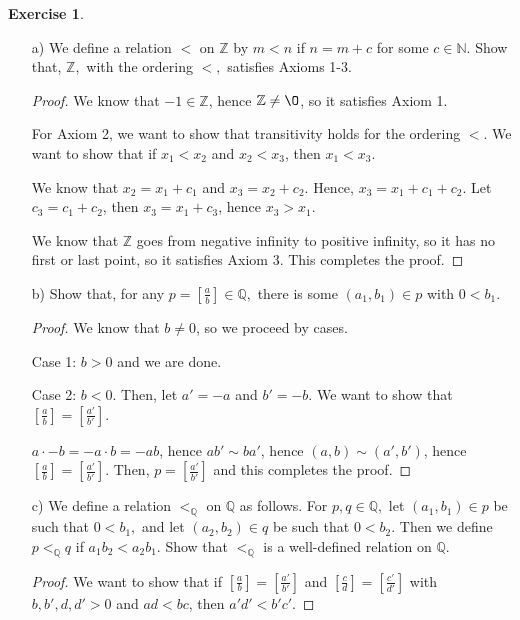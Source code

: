 \documentclass[11pt]{article}
\newcommand{\bbN}{\mathbb{N}}
\newcommand{\bbQ}{\mathbb{Q}}
\newcommand{\bbZ}{\mathbb{Z}}
\renewcommand{\emptyset}{\O}
\renewcommand{\_}[1]{\underline{ #1 }}
\theoremstyle{definition}
\newtheorem{exercise}[theorem]{Exercise}
\numberwithin{equation}{subsection}
\begin{document}
\begin{exercise}
\begin{enumerate}
\item[a)]  We define a relation $<$ on $\bbZ$ by $m<n$ if $n=m+c$ for some $c\in \bbN.$  Show that,
$\bbZ,$ with the ordering $<,$ satisfies Axioms 1-3.

\begin{proof}
We know that $-1 \in \bbZ$, hence $\bbZ \not= \emptyset$, so it satisfies Axiom 1.

For Axiom 2, we want to show that transitivity holds for the ordering $<$. We want to show that if $x_1<x_2$ and $x_2<x_3$, then $x_1<x_3$.

We know that $x_2 = x_1 + c_1$ and $x_3 = x_2 + c_2$. Hence, $x_3 = x_1 + c_1 + c_2$. Let $c_3 = c_1 + c_2$, then $x_3 = x_1 + c_3$, hence $x_3 > x_1$.

We know that $\bbZ$ goes from negative infinity to positive infinity, so it has no first or last point, so it satisfies Axiom 3. This completes the proof.

\renewcommand\qedsymbol{QED}
\end{proof}

\item[b)] Show that, for any $p=\left[\frac{a}{b}\right]\in\bbQ,$ there is some $(a_1,b_1)\in p$ with $0<b_1.$

\begin{proof}
We know that $b \not= 0$, so we proceed by cases.

Case 1: $b > 0$ and we are done.

Case 2: $b < 0$. Then, let $a' = -a$ and $b' = -b$. We want to show that $[\frac{a}{b}] = [\frac{a'}{b'}]$. 

$a \cdot -b = -a \cdot b = -ab$, hence $ab' \sim ba'$, hence $(a,b) \sim (a',b')$, hence $[\frac{a}{b}] = [\frac{a'}{b'}]$. Then, $p=[\frac{a'}{b'}]$ and this completes the proof.

\renewcommand\qedsymbol{QED}
\end{proof}

\item[c)] We define a relation $<_{\bbQ}$ on $\bbQ$ as follows. 
For $p,q\in\bbQ,$ let $(a_1,b_1)\in p$ be such that $0<b_1,$ and let $(a_2,b_2)\in q$ be such that $0<b_2.$  Then we define $p<_{\bbQ} q$ if $a_1b_2<a_2 b_1.$ 
Show that $<_{\bbQ}$ is a well-defined relation on $\bbQ.$

\begin{proof}
We want to show that if $[\frac{a}{b}] = [\frac{a'}{b'}]$ and $[\frac{c}{d}] = [\frac{c'}{d'}]$ with $b,b',d,d' > 0$ and $ad < bc$, then $a'd' < b'c'$. 


\end{proof}
\end{enumerate}
\end{exercise}
\end{document}
